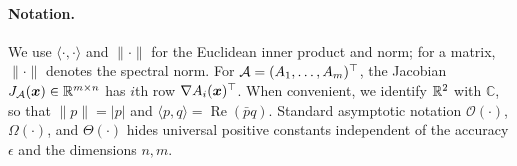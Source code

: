 \paragraph{Notation.} We use \(\langle\cdot,\cdot\rangle\) and \(\|\cdot\|\) for the Euclidean inner
product and norm; for a matrix, \(\|\cdot\|\) denotes the spectral norm. For
\(\mathcal{A}=(A_1,\ldots,A_m)^\top\), the Jacobian \(J_{\mathcal{A}}(\bm{x})\in\mathbb{R}^{m\times n}\)
has \(i\)th row \(\nabla A_i(\bm{x})^\top\). When convenient, we identify \(\mathbb{R}^2\)
with \(\mathbb C\), so that \(\|p\|=|p|\) and
\(\langle p,q\rangle=\operatorname{Re}(\bar pq)\). Standard asymptotic notation
\(\mathcal O(\cdot)\), \(\Omega(\cdot)\), and \(\Theta(\cdot)\) hides universal
positive constants independent of the accuracy \(\epsilon\) and the dimensions
\(n,m\).